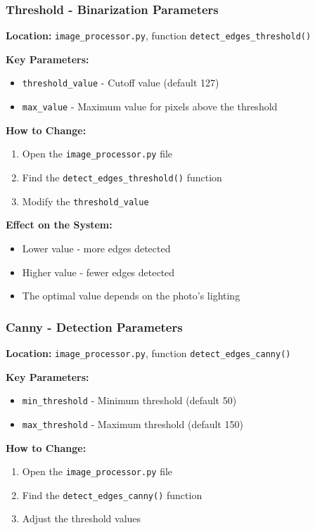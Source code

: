 \documentclass[a4paper,12pt]{article}
\begin{document}
\subsubsection{Threshold - Binarization Parameters}
\textbf{Location:} \texttt{image\_processor.py}, function \texttt{detect\_edges\_threshold()}

\textbf{Key Parameters:}
\begin{itemize}
\item \texttt{threshold\_value} - Cutoff value (default 127)
\item \texttt{max\_value} - Maximum value for pixels above the threshold
\end{itemize}

\textbf{How to Change:}
\begin{enumerate}
\item Open the \texttt{image\_processor.py} file
\item Find the \texttt{detect\_edges\_threshold()} function
\item Modify the \texttt{threshold\_value}
\end{enumerate}

\textbf{Effect on the System:}
\begin{itemize}
\item Lower value - more edges detected
\item Higher value - fewer edges detected
\item The optimal value depends on the photo's lighting
\end{itemize}

\subsubsection{Canny - Detection Parameters}
\textbf{Location:} \texttt{image\_processor.py}, function \texttt{detect\_edges\_canny()}

\textbf{Key Parameters:}
\begin{itemize}
\item \texttt{min\_threshold} - Minimum threshold (default 50)
\item \texttt{max\_threshold} - Maximum threshold (default 150)
\end{itemize}

\textbf{How to Change:}
\begin{enumerate}
\item Open the \texttt{image\_processor.py} file
\item Find the \texttt{detect\_edges\_canny()} function
\item Adjust the threshold values
\end{enumerate}
\end{document}

